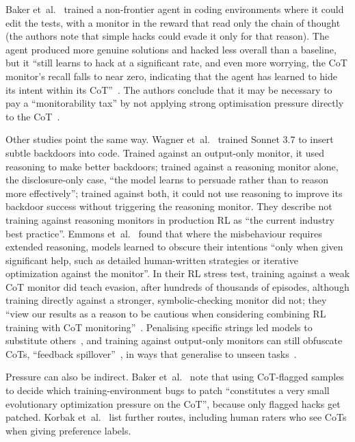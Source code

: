 \documentclass[review,12pt]{elsarticle}
\begin{document}
Baker et~al.~\cite[Sec.~3]{baker2025} trained a non-frontier agent in coding environments where it could edit the tests, with a monitor in the reward that read only the chain of thought (the authors note that simple hacks could evade it only for that reason). The agent produced more genuine solutions and hacked less overall than a baseline, but it ``still learns to hack at a significant rate, and even more worrying, the CoT monitor's recall falls to near zero, indicating that the agent has learned to hide its intent within its CoT''~\cite[Sec.~3.2]{baker2025}. The authors conclude that it may be necessary to pay a ``monitorability tax'' by not applying strong optimisation pressure directly to the CoT~\cite[abstract]{baker2025}.

Other studies point the same way. Wagner et~al.~\cite{wagner2025} trained Sonnet 3.7 to insert subtle backdoors into code. Trained against an output-only monitor, it used reasoning to make better backdoors; trained against a reasoning monitor alone, the disclosure-only case, ``the model learns to persuade rather than to reason more effectively''; trained against both, it could not use reasoning to improve its backdoor success without triggering the reasoning monitor. They describe not training against reasoning monitors in production RL as ``the current industry best practice''. Emmons et~al.~\cite{emmons2025} found that where the misbehaviour requires extended reasoning, models learned to obscure their intentions ``only when given significant help, such as detailed human-written strategies or iterative optimization against the monitor''. In their RL stress test, training against a weak CoT monitor did teach evasion, after hundreds of thousands of episodes, although training directly against a stronger, symbolic-checking monitor did not; they ``view our results as a reason to be cautious when considering combining RL training with CoT monitoring''~\cite[Sec.~7]{emmons2025}. Penalising specific strings led models to substitute others~\cite{skaf2025}, and training against output-only monitors can still obfuscate CoTs, ``feedback spillover''~\cite{drori2025}, in ways that generalise to unseen tasks~\cite{mitranihadida2026}.

Pressure can also be indirect. Baker et~al.~\cite[Sec.~5.2]{baker2025} note that using CoT-flagged samples to decide which training-environment bugs to patch ``constitutes a very small evolutionary optimization pressure on the CoT'', because only flagged hacks get patched. Korbak et~al.~\cite[Sec.~2]{korbak2025} list further routes, including human raters who see CoTs when giving preference labels.
\end{document}
